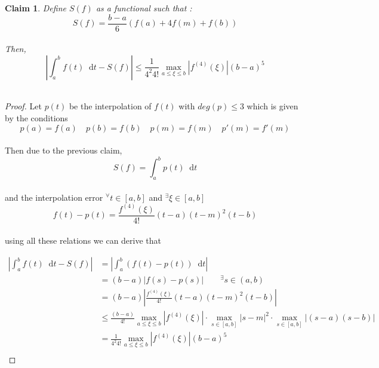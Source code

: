 \documentclass[paper=a4, fontsize=11pt]{scrartcl}
\newcommand*\dif{\mathop{}\!\mathrm{d}}
\newtheorem{claim}{Claim}
\begin{document}
\begin{claim}
	Define $S(f)$ as a functional such that : \\
	
	\begin{equation}\nonumber
		S(f) = \frac{b-a}{6} (f(a) + 4 f(m) + f(b))
	\end{equation}\\
	
	Then, \\
	
	\begin{equation}\nonumber
		\left| \int_{a}^{b} f(t) \dif t - S(f) \right| \leq \frac{1}{4^2 4!} \max_{a\leq\xi\leq b} |f^{(4)}(\xi)| (b-a)^5
	\end{equation}\\
\end{claim}

\begin{proof}
Let $p(t)$ be the interpolation of $f(t)$ with $deg(p) \leq 3$ which is given by the conditions \\

\begin{equation}\nonumber
p(a) = f(a) \quad p(b)=f(b) \quad p(m)=f(m) \quad p'(m) = f'(m)
\end{equation}\\

Then due to the previous claim, \\

\begin{equation}\nonumber
	S(f) = \int_{a}^{b} p(t) \dif t
\end{equation}\\

and the interpolation error $^\forall t \in [a,b]$ and $^\exists \xi \in [a,b]$ \\

\begin{equation}\nonumber
	f(t)-p(t) = \frac{f^{(4)}(\xi)}{4!}(t-a)(t-m)^2(t-b)
\end{equation}\\

using all these relations we can derive that 

\begin{equation}\nonumber
\begin{split}
	\left| \int_{a}^{b} f(t) \dif t - S(f) \right|  &= 	\left| \int_{a}^{b} (f(t)  - p(t)) \dif t\right|  \\[2.5ex]
	&= (b-a) |f(s)-p(s)| \qquad  ^\exists s \in (a,b)\\[2.5ex]
	&= (b-a) \left|  \frac{f^{(4)}(\xi)}{4!}(t-a)(t-m)^2(t-b)  \right| \\[2.5ex]
	&\leq  \frac{(b-a)}{4!} \max_{a\leq\xi\leq b} |f^{(4)}(\xi)| \cdot \max_{s \in [a,b]} |s-m|^2 \cdot \max_{s \in [a,b]} |(s-a)(s-b)| \\[2.5ex]
	&= \frac{1}{4^2 4!} \max_{a\leq\xi\leq b} |f^{(4)}(\xi)| (b-a)^5 \\
\end{split}
\end{equation}

\end{proof}
\end{document}
